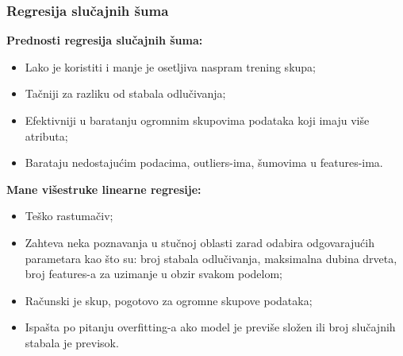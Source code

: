 \documentclass[fontsize=12bp, paper=a4]{scrarticle}
\begin{document}
\subsubsection{Regresija slučajnih šuma}
\textbf{Prednosti regresija slučajnih šuma:\cite{rfr}} 
\begin{itemize}
\item Lako je koristiti i manje je osetljiva naspram trening skupa;
\item Tačniji za razliku od stabala odlučivanja;
\item Efektivniji u baratanju ogromnim skupovima podataka koji imaju više atributa;
\item Barataju nedostajućim podacima, outliers-ima, šumovima u features-ima.
\end{itemize}

\textbf{Mane višestruke linearne regresije:}
\begin{itemize}
    \item Teško rastumačiv;
    \item Zahteva neka poznavanja u stučnoj oblasti zarad odabira odgovarajućih parametara kao što su: broj stabala odlučivanja, maksimalna dubina drveta, broj features-a za uzimanje u obzir svakom podelom;
    \item Računski je skup, pogotovo za ogromne skupove podataka;
    \item Ispašta po pitanju overfitting-a ako model je previše složen ili broj slučajnih stabala je previsok.
\end{itemize}

\end{document}
